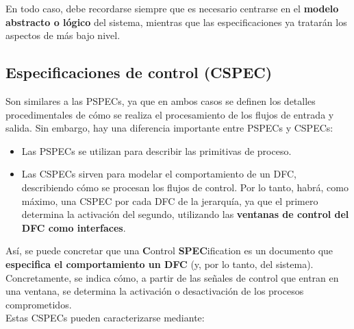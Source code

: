 En todo caso, debe recordarse siempre que es necesario centrarse en el \textbf{modelo abstracto o lógico} del sistema, mientras que las especificaciones ya tratarán los aspectos de más bajo nivel.

\subsection{Especificaciones de control (CSPEC)}

Son similares a las PSPECs, ya que en ambos casos se definen los detalles procedimentales de cómo se realiza el procesamiento de los flujos de entrada y salida. Sin embargo, hay una diferencia importante entre PSPECs y CSPECs:

\begin{itemize}
    \item Las PSPECs se utilizan para describir las primitivas de proceso.
    \item Las CSPECs sirven para modelar el comportamiento de un DFC, describiendo cómo se procesan los flujos de control. Por lo tanto, habrá, como máximo, una CSPEC por cada DFC de la jerarquía, ya que el primero determina la activación del segundo, utilizando las \textbf{ventanas de control del DFC como interfaces}.
\end{itemize}

Así, se puede concretar que una \textbf{C}ontrol \textbf{SPEC}ification es un documento que \textbf{especifica el comportamiento un DFC} (y, por lo tanto, del sistema). Concretamente, se indica cómo, a partir de las señales de control que entran en una ventana, se determina la activación o desactivación de los procesos comprometidos.\\

Estas CSPECs pueden caracterizarse mediante:

